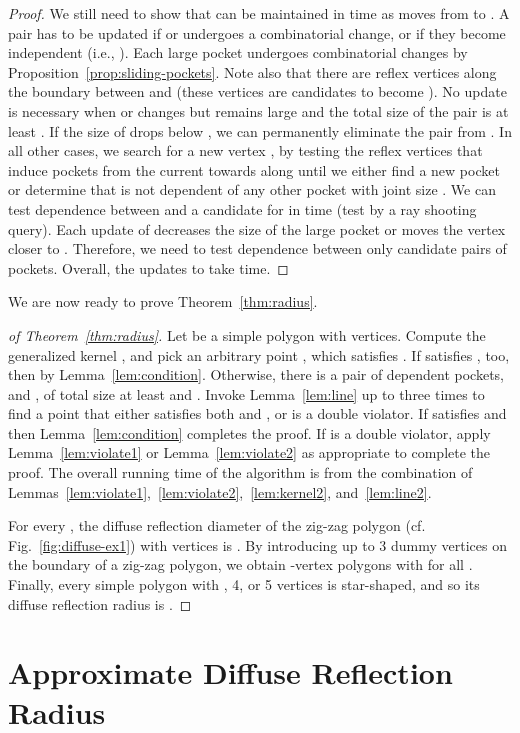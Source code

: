 \documentclass[12pt]{article}
\begin{document}
\begin{proof}
We still need to show that  can be maintained in  time as  moves from  to . A pair   has to be updated if  or  undergoes a combinatorial change, or if they become independent (i.e., ). Each large pocket undergoes  combinatorial changes by Proposition~\ref{prop:sliding-pockets}. Note also that there are  reflex vertices along the boundary  between  and  (these vertices are candidates to become ).
No update is necessary when  or  changes but  remains large and the total size of the pair is at least . If the size of  drops below , we can permanently eliminate the pair from . In all other cases, we search for a new vertex , by testing the reflex vertices that induce pockets from the current  towards  along  until we either find a new pocket  or determine that  is not dependent of any other pocket with joint size . We can test dependence between  and a candidate for  in  time (test  by a ray shooting query). Each update of  decreases the size of the large pocket  or moves the vertex  closer to . Therefore, we need to test dependence between only  candidate pairs of pockets. Overall, the updates to  take  time.
\end{proof}

We are now ready to prove Theorem~\ref{thm:radius}.
\begin{proof}[of Theorem~\ref{thm:radius}]
Let  be a simple polygon with  vertices.
Compute the generalized kernel ,
and pick an arbitrary point ,
which satisfies . If  satisfies , too,
then  by Lemma~\ref{lem:condition}.
Otherwise, there is a pair of dependent pockets,  and ,
of total size at least  and .
Invoke Lemma~\ref{lem:line} up to three times to find a point 
that either satisfies both  and , or is a double violator.
If  satisfies  and  then Lemma~\ref{lem:condition}
completes the proof. If  is a double violator, apply Lemma~\ref{lem:violate1} or Lemma~\ref{lem:violate2} as appropriate to complete the proof. The overall running time
of the algorithm is  from the combination of Lemmas~\ref{lem:violate1},~\ref{lem:violate2},~\ref{lem:kernel2}, and~\ref{lem:line2}.

For every , the diffuse reflection diameter of the zig-zag polygon (cf. Fig.~\ref{fig:diffuse-ex1}) with  vertices is . By introducing up to 3 dummy vertices on the boundary of a zig-zag polygon, we obtain -vertex polygons  with  for all . Finally, every simple polygon with , 4, or 5 vertices is star-shaped, and so its diffuse reflection radius is .
\end{proof}

\section{Approximate Diffuse Reflection Radius}
\end{document}
